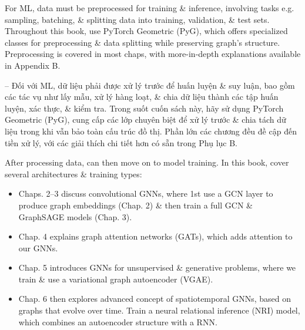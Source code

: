 \documentclass{article}
\begin{document}
\begin{itemize}
\begin{itemize}
\begin{itemize}
            For ML, data must be preprocessed for training \& inference, involving tasks e.g. sampling, batching, \& splitting data into training, validation, \& test sets. Throughout this book, use PyTorch Geometric (PyG), which offers specialized classes for preprocessing \& data splitting while preserving graph's structure. Preprocessing is covered in most chaps, with more-in-depth explanations available in Appendix B.

            -- Đối với ML, dữ liệu phải được xử lý trước để huấn luyện \& suy luận, bao gồm các tác vụ như lấy mẫu, xử lý hàng loạt, \& chia dữ liệu thành các tập huấn luyện, xác thực, \& kiểm tra. Trong suốt cuốn sách này, hãy sử dụng PyTorch Geometric (PyG), cung cấp các lớp chuyên biệt để xử lý trước \& chia tách dữ liệu trong khi vẫn bảo toàn cấu trúc đồ thị. Phần lớn các chương đều đề cập đến tiền xử lý, với các giải thích chi tiết hơn có sẵn trong Phụ lục B.

            After processing data, can then move on to model training. In this book, cover several architectures \& training types:
            \begin{itemize}
                \item Chaps. 2--3 discuss convolutional GNNs, where 1st use a GCN layer to produce graph embeddings (Chap. 2) \& then train a full GCN \& GraphSAGE models (Chap. 3).
                \item Chap. 4 explains graph attention networks (GATs), which adds attention to our GNNs.
                \item Chap. 5 introduces GNNs for unsupervised \& generative problems, where we train \& use a variational graph autoencoder (VGAE).
                \item Chap. 6 then explores advanced concept of spatiotemporal GNNs, based on graphs that evolve over time. Train a neural relational inference (NRI) model, which combines an autoencoder structure with a RNN.


\end{itemize}
\end{itemize}
\end{itemize}
\end{itemize}
\end{document}
